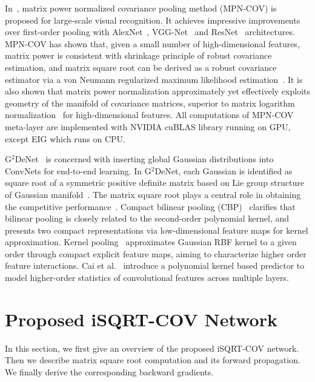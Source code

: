 \documentclass[10pt,twocolumn,letterpaper]{article}
\begin{document}
In~\cite{Li_2017_ICCV}, matrix power normalized covariance pooling method (MPN-COV) is proposed  for large-scale visual recognition. It achieves impressive  improvements over first-order pooling with  AlexNet~\cite{Krizhevsky2012ImageNet}, VGG-Net~\cite{DBLP:conf/bmvc/ChatfieldSVZ14,Simonyan15} and ResNet~\cite{He_2016_CVPR} architectures. MPN-COV has shown that,  given a small number of high-dimensional features,  matrix power is consistent with shrinkage principle of robust covariance estimation, and matrix square root can be derived as a robust covariance estimator via  a von Neumann regularized maximum likelihood estimation~\cite{Wang_2016_CVPR}. It is also shown that matrix power normalization approximately yet effectively exploits geometry of the manifold of covariance matrices, superior to matrix logarithm normalization~\cite{Ionescu_2015_ICCV} for high-dimensional  features. All computations of MPN-COV meta-layer are implemented with NVIDIA cuBLAS library running on GPU, except EIG which runs on CPU.

G$^2$DeNet~\cite{Wang_2017_CVPR} is concerned with inserting global Gaussian distributions into  ConvNets for end-to-end learning. In G$^2$DeNet, each Gaussian  is identified as square root of a symmetric positive definite matrix based on Lie group structure of Gaussian manifold~\cite{LE2MG}. The matrix square root  plays a central role in obtaining the competitive performance~\cite[Tab. 1 \& Tab. 5]{Wang_2017_CVPR}.   Compact bilinear pooling (CBP)~\cite{Gao_2016_CVPR} clarifies that bilinear pooling is closely related to the second-order polynomial kernel, and presents two compact representations via low-dimensional feature maps for kernel approximation. Kernel pooling~\cite{Cui_2017_CVPR} approximates Gaussian RBF kernel to a given order through compact explicit feature maps, aiming to characterize higher order feature interactions.  Cai et al.~\cite{Cai_2017_ICCV} introduce a polynomial kernel based predictor to model higher-order statistics of convolutional features across multiple layers. 




\section{Proposed iSQRT-COV Network}\label{section:proposed-method}

In this section, we first give an overview of the proposed iSQRT-COV network. Then we describe matrix square root computation and its forward  propagation. We finally  derive the corresponding backward gradients.
\end{document}
